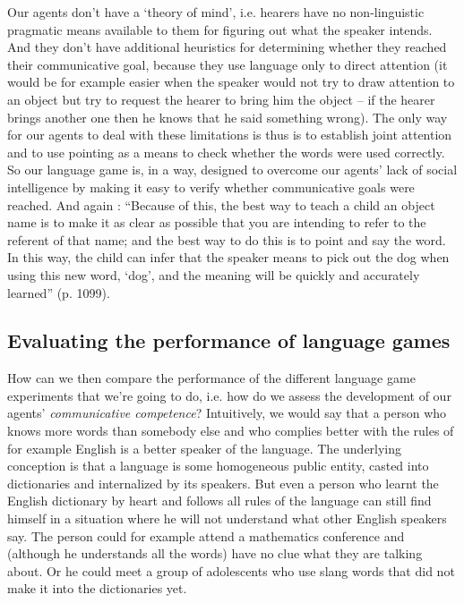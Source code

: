 Our agents don't have a `theory of mind', i.e. hearers have no
non-linguistic pragmatic means available to them for figuring out what
the speaker intends. And they don't have additional heuristics for
determining whether they reached their communicative goal, because
they use language only to direct attention (it would be for example
easier when the speaker would not try to draw attention to an object
but try to request the hearer to bring him the object -- if the hearer
brings another one then he knows that he said something wrong). The
only way for our agents to deal with these limitations is thus is to
establish joint attention and to use pointing as a means to check
whether the words were used correctly. So our language game is, in a
way, designed to overcome our agents' lack of social intelligence by
making it easy to verify whether communicative goals were reached. And
again \cite{bloom01precis}: ``Because of this, the best way to teach a
child an object name is to make it as clear as possible that you are
intending to refer to the referent of that name; and the best way to
do this is to point and say the word. In this way, the child can infer
that the speaker means to pick out the dog when using this new word,
`dog', and the meaning will be quickly and accurately learned''
(p. 1099).


\subsection{Evaluating the performance of language games}
\label{s:evaluating-language-games}

How can we then compare the performance of the different language game
experiments that we're going to do, i.e. how do we assess the
development of our agents' \emph{communicative competence}?
Intuitively, we would say that a person who knows more words than
somebody else and who complies better with the rules of for example
English is a better speaker of the language. The underlying conception
is that a language is some homogeneous public entity, casted into
dictionaries and internalized by its speakers. But even a person who
learnt the English dictionary by heart and follows all rules of the
language can still find himself in a situation where he will not
understand what other English speakers say. The person could for
example attend a mathematics conference and (although he understands
all the words) have no clue what they are talking about. Or he could
meet a group of adolescents who use slang words that did not make it
into the dictionaries yet.


